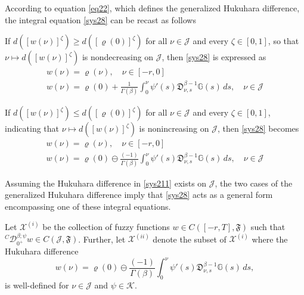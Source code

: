 \documentclass[reqno]{amsart}
\begin{document}
\begin{remark}\label{rq22} \rm
According to equation \eqref{eq22}, which defines the generalized Hukuhara difference, 
the integral equation \eqref{sys28} can be recast as follows

If \(d([ w(\nu )]^{\zeta}) \geq d([\varrho(0)]^{\zeta})\) for all 
\(\nu \in \mathcal{J}\) and every \(\zeta \in [0,1]\), so that 
\(\nu \mapsto d([ w(\nu )]^{\zeta})\) is nondecreasing on \(\mathcal{J}\), 
then \eqref{sys28} is expressed as
\begin{equation} \label{sys210}
\begin{gathered}
 w(\nu ) = \varrho(\nu ), \quad \nu \in [- r, 0] \tag{2.10} \\
 w(\nu ) = \varrho(0) + \frac{1}{\Gamma(\beta)} \int_0^{\nu } \psi'(s)
  \mathfrak{D}_{\nu ,s}^{\beta-1} \mathbb{G}(s) \, ds, \quad \nu \in \mathcal{J}
\end{gathered}
\end{equation}

If \(d([ w(\nu )]^{\zeta}) \leq d([\varrho(0)]^{\zeta})\) for all 
\(\nu \in \mathcal{J}\) and every \(\zeta \in [0,1]\), indicating that 
\(\nu \mapsto d([ w(\nu )]^{\zeta})\) is nonincreasing on \(\mathcal{J}\), 
then \eqref{sys28} becomes
\begin{equation} \label{sys211}
\begin{gathered}
 w(\nu ) = \varrho(\nu ), \quad \nu \in [- r, 0] \tag{2.11} \\
 w(\nu ) = \varrho(0) \ominus \frac{(-1)}{\Gamma(\beta)} \int_0^{\nu }
  \psi'(s) \mathfrak{D}_{\nu ,s}^{\beta-1} \mathbb{G}(s) \, ds, \quad
  \nu \in \mathcal{J}
\end{gathered}
\end{equation}

Assuming the Hukuhara difference in \eqref{sys211} exists on \(\mathcal{J}\), 
the two cases of the generalized Hukuhara difference imply that \eqref{sys28} acts 
as a general form encompassing one of these integral equations.

Let \(\mathcal{X}^{(i)}\) be the collection of fuzzy functions 
\( w \in C([- r, T], \mathfrak{F})\) such that 
\({}^C \mathcal{D}_{0^{+}}^{\beta ; \psi} w \in C(\mathcal{J}, \mathfrak{F})\).
Further, let \(\mathcal{X}^{(ii)}\) denote the subset of \(\mathcal{X}^{(i)}\) 
where the Hukuhara difference
\[
 w(\nu ) = \varrho(0) \ominus \frac{(-1)}{\Gamma(\beta)} \int_0^{\nu } \psi'(s)
 \mathfrak{D}_{\nu ,s}^{\beta-1} \mathbb{G}(s) \, ds,
\]
is well-defined for \(\nu \in \mathcal{J}\) and \(\psi \in \mathcal{K}\).
\end{remark}
\end{document}
